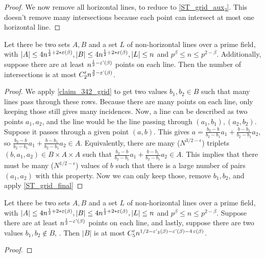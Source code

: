 \begin{proof}
    \leanok
    We now remove all horizontal lines, to reduce to \ref{ST_grid_aux₂}.
    This doesn't remove many intersections because each point can intersect at most one horizontal line.
\end{proof}

\begin{theorem}
    \label{ST_grid_aux₂}
    \leanok
    Let there be two sets $A, B$ and a set $L$ of non-horizontal lines over a prime field, 
    with $|A| \leq 4n^{\frac12 + 2*\operatorname{\varepsilon}(\beta)}, |B| \leq 4n^{\frac12 + 2*\operatorname{\varepsilon}(\beta)}, |L| \leq n$ and $p^\beta \leq n \leq p^{2 - \beta}$.
    Additionally, suppose there are at least $n^{\frac12 - \operatorname{\varepsilon'}(\beta)}$ points on each line.
    Then the number of intersections is at most $C'_2 n^{\frac32 - \operatorname{\varepsilon'}(\beta)}$.
\end{theorem}

\begin{proof}
    \leanok
    We apply \ref{claim_342_grid} to get two values $b_1, b_2 \in B$ such that many lines pass
    through these rows. Because there are many points on each line, only keeping those still gives many
    incidences. Now, a line can be described as two points $a_1, a_2$, and the line would be the line passing through
    $(a_1, b_1), (a_2, b_2)$. Suppose it passes through a given point $(a, b)$. This gives
    $a = \frac{b_2 - b}{b_2 - b_1} a_1 + \frac{b - b_1}{b_2 - b_1} a_2$, so
    $\frac{b_2 - b}{b_2 - b_1} a_1 + \frac{b - b_1}{b_2 - b_1} a_2 \in A$. Equivalently, there are many ($N^{3/2 - \epsilon}$) triplets
    $(b, a_1, a_2) \in B \times A \times A$ such that $\frac{b_2 - b}{b_2 - b_1} a_1 + \frac{b - b_1}{b_2 - b_1} a_2 \in A$.
    This implies that there must be many ($N^{1/2 - \epsilon}$) values of $b$ such that there is a large number of pairs
    $(a_1, a_2)$ with this property. Now we can only keep those, remove $b_1, b_2$, and apply \ref{ST_grid_final}
\end{proof}

\begin{theorem}
    \label{ST_grid_final}
    \leanok
    Let there be two sets $A, B$ and a set $L$ of non-horizontal lines over a prime field, 
    with $|A| \leq 4n^{\frac12 + 2*\operatorname{\varepsilon}(\beta)}, |B| \leq 4n^{\frac12 + 2*\operatorname{\varepsilon}(\beta)}, |L| \leq n$ and $p^\beta \leq n \leq p^{2 - \beta}$.
    Suppose there are at least $n^{\frac12 - \operatorname{\varepsilon'}(\beta)}$ points on each line, and lastly,
    suppose there are two values $b_1, b_2 \notin B$, .
    Then $|B|$ is at most $C'_5 n^{1/2 - \operatorname{\varepsilon'_2}(\beta) - \operatorname{\varepsilon'}(\beta) - 4 \operatorname{\varepsilon}(\beta)}$.
\end{theorem}

\begin{proof}
    \leanok
\end{proof}